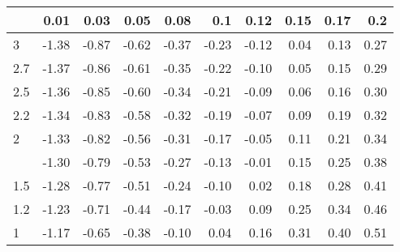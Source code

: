 
\begin{tabular}{lrrrrrrrrr}
\toprule
  & 0.01 & 0.03 & 0.05 & 0.08 & 0.1 & 0.12 & 0.15 & 0.17 & 0.2\\
\midrule
3 & -1.38 & -0.87 & -0.62 & -0.37 & -0.23 & -0.12 & 0.04 & 0.13 & 0.27\\
2.7 & -1.37 & -0.86 & -0.61 & -0.35 & -0.22 & -0.10 & 0.05 & 0.15 & 0.29\\
2.5 & -1.36 & -0.85 & -0.60 & -0.34 & -0.21 & -0.09 & 0.06 & 0.16 & 0.30\\
2.2 & -1.34 & -0.83 & -0.58 & -0.32 & -0.19 & -0.07 & 0.09 & 0.19 & 0.32\\
2 & -1.33 & -0.82 & -0.56 & -0.31 & -0.17 & -0.05 & 0.11 & 0.21 & 0.34\\
\addlinespace
1.7 & -1.30 & -0.79 & -0.53 & -0.27 & -0.13 & -0.01 & 0.15 & 0.25 & 0.38\\
1.5 & -1.28 & -0.77 & -0.51 & -0.24 & -0.10 & 0.02 & 0.18 & 0.28 & 0.41\\
1.2 & -1.23 & -0.71 & -0.44 & -0.17 & -0.03 & 0.09 & 0.25 & 0.34 & 0.46\\
1 & -1.17 & -0.65 & -0.38 & -0.10 & 0.04 & 0.16 & 0.31 & 0.40 & 0.51\\
\bottomrule
\end{tabular}
